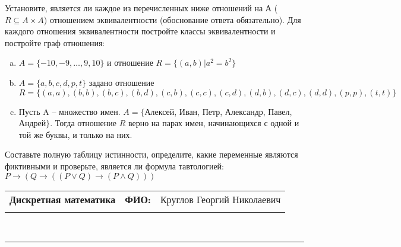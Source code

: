 \documentclass[10pt]{exam}
\newcommand{\class}{Дискретная математика}
\newcommand{\examdate}{}
\begin{document}
\begin{questions}
\question
Установите, является ли каждое из перечисленных ниже отношений на А ($R \subseteq A \times A$) отношением эквивалентности (обоснование ответа обязательно). Для каждого отношения эквивалентности постройте классы 
эквивалентности и постройте граф отношения:
\begin{enumerate} [a)]\setcounter{enumi}{0}
\item $A = \{-10, -9, … , 9, 10\}$ и отношение $R = \{(a,b)|a^{2} = b^{2}\}$
\item $A = \{a, b, c, d, p, t\}$ задано отношение $R = \{(a, a), (b, b), (b, c), (b, d), (c, b), (c, c), (c, d), (d, b), (d, c), (d, d), (p,p), (t,t)\}$
\item Пусть A – множество имен. $A = \{ $Алексей, Иван, Петр, Александр, Павел, Андрей$ \}$. Тогда отношение $R$ верно на парах имен, начинающихся с одной и той же буквы, и только на них.
\end{enumerate}\question Составьте полную таблицу истинности, определите, какие переменные являются фиктивными и проверьте, является ли формула тавтологией:
$ P \rightarrow (Q \rightarrow ((P \lor Q) \rightarrow (P \land Q)))$

\end{questions}
\newpage
\begin{flushright}
\begin{tabular}{p{2.8in} r l}
\textbf{\class} & \textbf{ФИО:} &Круглов Георгий Николаевич
\\

\textbf{\examdate} &&\\
\end{tabular}\\
\end{flushright}
\rule[1ex]{\textwidth}{.1pt}
\end{document}
